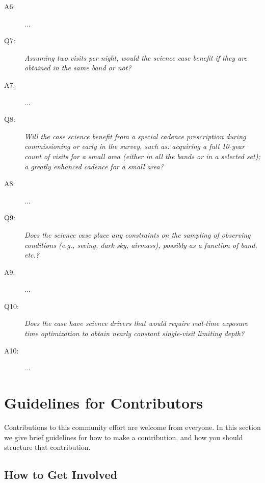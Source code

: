 \begin{description}
\item[A6:] ...

\item[Q7:] {\it Assuming two visits per night, would the science case
benefit if they are obtained in the same band or not?}

\item[A7:] ...

\item[Q8:] {\it Will the case science benefit from a special cadence
prescription during commissioning or early in the survey, such as:
acquiring a full 10-year count of visits for a small area (either in all
the bands or in a  selected set); a greatly enhanced cadence for a small
area?}

\item[A8:] ...

\item[Q9:] {\it Does the science case place any constraints on the
sampling of observing conditions (e.g., seeing, dark sky, airmass),
possibly as a function of band, etc.?}

\item[A9:] ...

\item[Q10:] {\it Does the case have science drivers that would require
real-time exposure time optimization to obtain nearly constant
single-visit limiting depth?}

\item[A10:] ...

\end{description}

\navigationbar



\section{Guidelines for Contributors}
\def\secname{guidelines}\label{sec:\secname}


Contributions to this community effort are welcome from everyone. In
this section we give brief guidelines for how to make a contribution,
and how you should structure that contribution.

\subsection{How to Get Involved}

